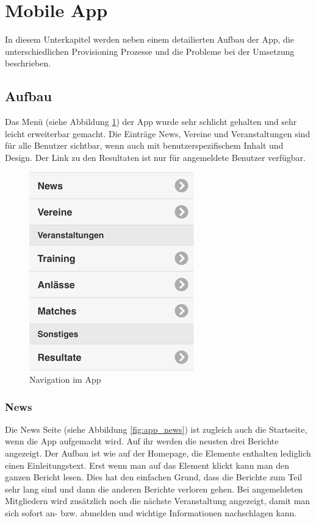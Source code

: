 \section{Mobile App}\label{impl_moblie_app}
In diesem Unterkapitel werden neben einem detailierten Aufbau der App, die unterschiedlichen Provisioning Prozesse und die Probleme bei der Umsetzung beschrieben.

\subsection{Aufbau}
Das Menü (siehe Abbildung \ref{fig:navigation}) der App wurde sehr schlicht gehalten und sehr leicht erweiterbar gemacht. Die Einträge News, Vereine und Veranstaltungen sind für alle Benutzer sichtbar, wenn auch mit benutzerspezifischem Inhalt und Design. Der Link zu den Resultaten ist nur für angemeldete Benutzer verfügbar.

\begin{figure}[h]
\centering
\includegraphics{images/app/navigation.png}
\caption{Navigation im App}
\label{fig:navigation}
\end{figure}

\FloatBarrier
\subsubsection{News}
Die News Seite (siehe Abbildung \ref{fig:app_news}) ist zugleich auch die Startseite, wenn die App aufgemacht wird. Auf ihr werden die neusten drei Berichte angezeigt. Der Aufbau ist wie auf der Homepage, die Elemente enthalten lediglich einen Einleitungstext. Erst wenn man auf das Element klickt kann man den ganzen Bericht lesen. Dies hat den einfachen Grund, dass die Berichte zum Teil sehr lang sind und dann die anderen Berichte verloren gehen. Bei angemeldeten Mitgliedern wird zusätzlich noch die nächste Veranstaltung angezeigt, damit man sich sofort an- bzw. abmelden und wichtige Informationen nachschlagen kann.

